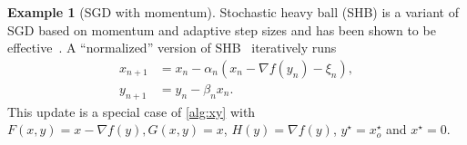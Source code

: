 \documentclass[11pt]{article}
\theoremstyle{plain}
\theoremstyle{definition}
\newtheorem{exam}{Example}[section]
\def\LGx{{L}_{G,x}}
\def\LGy{{L}_{G,y}}
\def\Hsmooth{{\delta_H}}
\def\Gsmooth{{\delta_G}}
\def\SBF{{S}_{B,F}}
\def\SBG{{S}_{B,G}}
\begin{document}
\begin{exam}[SGD with momentum]\label{exmp:momentum}
	Stochastic heavy ball (SHB) is a variant of SGD based on momentum and adaptive step sizes and has been shown to be effective~\citep{gadat2018stochastic}.
	A ``normalized''  version of SHB~\citep{gupal1972stochastic,gitman2019understanding} iteratively runs
	\begin{equation}\label{eq:SHB}
		\begin{aligned}
			x_{n+1} &= x_{n} - \alpha_n (x_n - \nabla f(y_n) - \xi_n),\\
			y_{n+1} &= y_{n} - \beta_n  x_{n}.
		\end{aligned}
	\end{equation}
	This update is a special case of 
	\eqref{alg:xy} with $F(x, y) = x-\nabla f(y), G(x, y) = x$, $H(y) = \nabla f(y)$,
	$y^{\star} = x_o^{\star}$ and $x^{\star} = 0$.

\end{exam}
\end{document}
